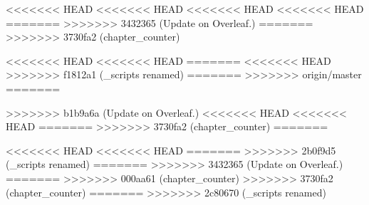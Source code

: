

% 
% 
\setcounter{chapter}{1}
<<<<<<< HEAD
<<<<<<< HEAD
<<<<<<< HEAD
<<<<<<< HEAD
=======
>>>>>>> 3432365 (Update on Overleaf.)
=======
>>>>>>> 3730fa2 (chapter_counter)

<<<<<<< HEAD
<<<<<<< HEAD
% 
% 
=======
<<<<<<< HEAD
>>>>>>> f1812a1 (_scripts renamed)
=======
>>>>>>> origin/master
% 
% 
=======


>>>>>>> b1b9a6a (Update on Overleaf.)
<<<<<<< HEAD
<<<<<<< HEAD
=======
>>>>>>> 3730fa2 (chapter_counter)
=======

% 
% 
<<<<<<< HEAD
<<<<<<< HEAD
=======
% 
% 
% 
>>>>>>> 2b0f9d5 (_scripts renamed)
=======
>>>>>>> 3432365 (Update on Overleaf.)
=======
>>>>>>> 000aa61 (chapter_counter)
>>>>>>> 3730fa2 (chapter_counter)
=======
>>>>>>> 2c80670 (_scripts renamed)
% 
% 

